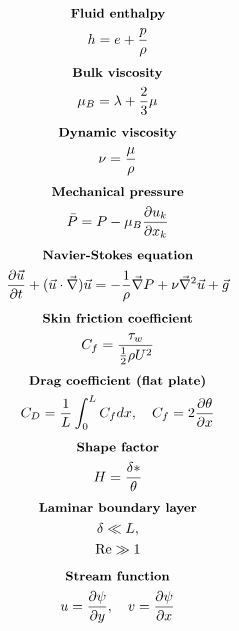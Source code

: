 \documentclass[10pt, a4paper]{article}
\newcommand{\derivative}[2]{\frac{\partial #1}{\partial #2}}
\begin{document}
\begin{multicols*}{2}
    \begin{gather*}
        \textbf{\small Fluid enthalpy} \\
        h = e + \frac{p}{\rho}
    \end{gather*}
    \begin{gather*}
        \textbf{\small Bulk viscosity} \\
        \mu_B = \lambda + \frac23 \mu
    \end{gather*}
    \begin{gather*}
        \textbf{\small Dynamic viscosity} \\
        \nu = \frac{\mu}{\rho}
    \end{gather*}
    \begin{gather*}
        \textbf{\small Mechanical pressure} \\
        \bar{P} = P - \mu_B\derivative{u_k}{x_k}
    \end{gather*}
    \begin{gather*}
        \textbf{\small Navier-Stokes equation} \\
        \derivative{ \vec{u}}{t} + (\vec{u}\cdot \vec{\nabla})\vec{u} = 
        -\frac{1}{\rho}\vec{\nabla}P + \nu \vec{\nabla}^2 \vec{u} + \vec{g}
    \end{gather*}
    \begin{gather*}
        \textbf{\small Skin friction coefficient} \\
        C_f = \frac{\tau_w}{\frac12 \rho U^2}
    \end{gather*}
    \begin{gather*}
        \textbf{\small Drag coefficient (flat plate)} \\
        C_D = \frac{1}{L}\int_0^L C_f dx, \quad C_f = 2\derivative{ \theta}{x}
    \end{gather*}
    \begin{gather*}
        \textbf{\small Shape factor} \\
        H = \frac{\delta *}{\theta}
    \end{gather*}
    \begin{gather*}
        \textbf{\small Laminar boundary layer} \\
        \delta \ll L, \\
        \text{Re} \gg 1
    \end{gather*}
    \begin{gather*}
        \textbf{\small Stream function} \\
        u = \derivative{\psi}{y}, \quad v = \derivative{\psi}{x}
    \end{gather*}
\end{multicols*}
\end{document}
